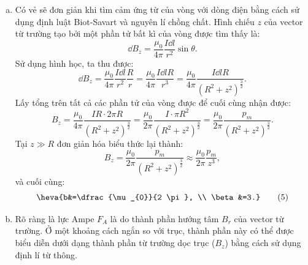 \begin{loigiai}
\begin{enumerate}[1)]
\begin{center}
    \end{center}
    \begin{enumerate}[a)]
        \item Có vẻ sẽ đơn giản khi tìm cảm ứng từ của vòng với dòng điện bằng cách sử dụng định luật Biot-Savart và nguyên lí chồng chất. Hình chiếu $z$ của vector từ trường tạo bởi một phần tử bất kì của vòng được tìm thấy là:
    \[\dd B_{z}=\dfrac{\mu_{0}}{4 \pi} \dfrac{I \dd l}{r^{2}} \sin \theta. \tag{1}\]
Sử dụng hình học, ta thu được:
\[
\dd B_{z}=\dfrac{\mu_{0}}{4 \pi} \dfrac{I \dd l}{r^{2}} \dfrac{R}{r}=\dfrac{\mu_{0}}{4 \pi} \dfrac{I \dd l R}{r^{3}}=\dfrac{\mu_{0}}{4 \pi} \dfrac{I \dd l R}{\left(R^{2}+z^{2}\right)^{\frac{3}{2}}}. \tag{2}
\]
Lấy tổng trên tất cả các phần tử của vòng được để cuối cùng nhận được:
\[
B_{z}=\dfrac{\mu_{0}}{4 \pi} \dfrac{I R \cdot 2 \pi R}{\left(R^{2}+z^{2}\right)^{\frac{3}{2}}}=\dfrac{\mu_{0}}{2 \pi} \dfrac{I \cdot \pi R^{2}}{\left(R^{2}+z^{2}\right)^{\frac{3}{2}}}=\dfrac{\mu_{0}}{2 \pi} \dfrac{p_{m}}{\left(R^{2}+z^{2}\right)^{\frac{3}{2}}}. \tag{3}
\]
Tại $z \gg R$ đơn giản hóa biểu thức lại thành:
\[
B_{z}=\dfrac{\mu_{0}}{2 \pi} \dfrac{p_{m}}{\left(R^{2}+z^{2}\right)^{\frac{3}{2}}} \approx \dfrac{\mu_{0}}{2 \pi} \dfrac{p_{m}}{z^{3}}, \tag{4} \label{tu4}
\]
và cuối cùng:
\[\heva{b&=\dfrac{\mu_{0}}{2 \pi}, \\
\beta&=3.}\tag{5} \]
\item 
Rõ ràng là lực Ampe $F_A$ là do thành phần hướng tâm $B_r$ của vector từ trường. Ở một khoảng cách ngắn so với trục, thành phần này có thể được biểu diễn dưới dạng thành phần từ trường dọc trục ($B_z$) bằng cách sử dụng định lí từ thông.
\begin{center}


\end{center}
\end{enumerate}
\end{enumerate}
\end{loigiai}
